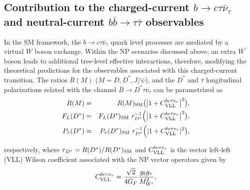 \documentclass[reprint,showpacs,aps,prd,nofootinbib,superscriptaddress,longbibliography]{revtex4-1}
\def\beq{\begin{equation}}
\def\eeq{\end{equation}}
\begin{document}



\subsection{Contribution to the charged-current $b \to c \tau \bar{\nu}_{\tau}$ and neutral-current $b  \bar{b} \to \tau \bar{\tau}$ observables}

In the SM framework, the $b \to c \tau \bar{\nu}_{\tau}$ quark level processes are mediated by a virtual $W$ boson exchange. Within the NP scenarios discussed above, an extra $W^\prime$ boson leads to additional tree-level effective interactions, therefore, modifying the theoretical predictions for the observables associated with this charged-current transition. The ratios $R(M)$ ($M=D,D^\ast,J/\psi$), and the $D^\ast$ and $\tau$ longitudinal polarizations related with the channel $\bar{B} \to D^\ast \tau\bar{\nu}_\tau$ can be parametrized as~\cite{Gomez:2019xfw}
\begin{eqnarray}
R(M) &=& R(M)_{\rm SM} \big(\big|1 + C_{\rm VLL}^{bc\tau\nu_\tau} \big|^2\big),  \label{RD} \\
F_L(D^*) &=&  F_L(D^*)_{\rm SM} \ r_{D^\ast}^{-1}  \Big( \big|1 + C_{\rm VLL}^{bc\tau\nu_\tau}\big|^2 \big), \label{FLD} \\
P_\tau(D^*) &=&  P_\tau(D^*)_{\rm SM} \ r_{D^\ast}^{-1} \Big(|1 + C_{\rm VLL}^{bc\tau\nu_\tau}|^2 \big), \label{PTAU}
\end{eqnarray}

\noindent respectively, where $r_{D^\ast} = R(D^*) / R(D^*)_{\rm SM}$ and $C_{\rm VLL}^{bc\tau\nu_\tau}$ is the vector left-left (VLL) Wilson coefficient associated with the NP vector operators given by
\beq \label{CLL}
C_{\rm VLL}^{bc\tau\nu_\tau} = \dfrac{\sqrt{2}}{4G_F} \dfrac{g_{b}g_{\tau}}{M_{W^\prime}^2}, 
\eeq
\end{document}
